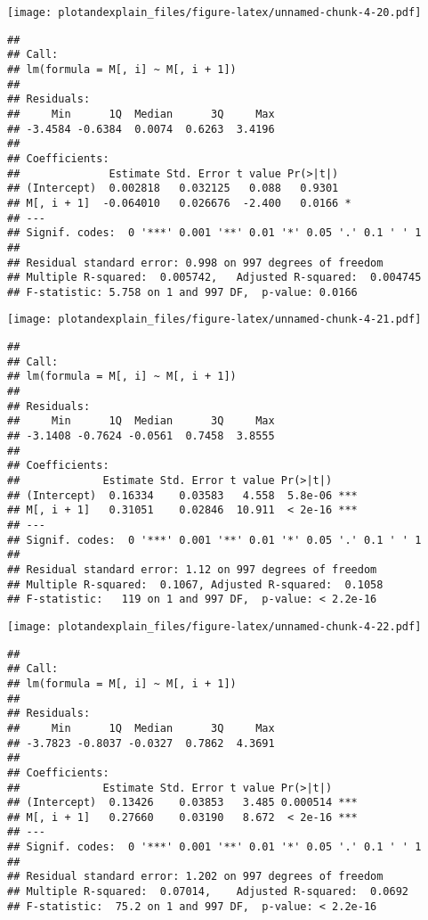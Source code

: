 \documentclass[]{article}
\begin{document}
\texttt{[image: plotandexplain\_files/figure-latex/unnamed-chunk-4-20.pdf]}

\begin{verbatim}
## 
## Call:
## lm(formula = M[, i] ~ M[, i + 1])
## 
## Residuals:
##     Min      1Q  Median      3Q     Max 
## -3.4584 -0.6384  0.0074  0.6263  3.4196 
## 
## Coefficients:
##              Estimate Std. Error t value Pr(>|t|)  
## (Intercept)  0.002818   0.032125   0.088   0.9301  
## M[, i + 1]  -0.064010   0.026676  -2.400   0.0166 *
## ---
## Signif. codes:  0 '***' 0.001 '**' 0.01 '*' 0.05 '.' 0.1 ' ' 1
## 
## Residual standard error: 0.998 on 997 degrees of freedom
## Multiple R-squared:  0.005742,   Adjusted R-squared:  0.004745 
## F-statistic: 5.758 on 1 and 997 DF,  p-value: 0.0166
\end{verbatim}

\texttt{[image: plotandexplain\_files/figure-latex/unnamed-chunk-4-21.pdf]}

\begin{verbatim}
## 
## Call:
## lm(formula = M[, i] ~ M[, i + 1])
## 
## Residuals:
##     Min      1Q  Median      3Q     Max 
## -3.1408 -0.7624 -0.0561  0.7458  3.8555 
## 
## Coefficients:
##             Estimate Std. Error t value Pr(>|t|)    
## (Intercept)  0.16334    0.03583   4.558  5.8e-06 ***
## M[, i + 1]   0.31051    0.02846  10.911  < 2e-16 ***
## ---
## Signif. codes:  0 '***' 0.001 '**' 0.01 '*' 0.05 '.' 0.1 ' ' 1
## 
## Residual standard error: 1.12 on 997 degrees of freedom
## Multiple R-squared:  0.1067, Adjusted R-squared:  0.1058 
## F-statistic:   119 on 1 and 997 DF,  p-value: < 2.2e-16
\end{verbatim}

\texttt{[image: plotandexplain\_files/figure-latex/unnamed-chunk-4-22.pdf]}

\begin{verbatim}
## 
## Call:
## lm(formula = M[, i] ~ M[, i + 1])
## 
## Residuals:
##     Min      1Q  Median      3Q     Max 
## -3.7823 -0.8037 -0.0327  0.7862  4.3691 
## 
## Coefficients:
##             Estimate Std. Error t value Pr(>|t|)    
## (Intercept)  0.13426    0.03853   3.485 0.000514 ***
## M[, i + 1]   0.27660    0.03190   8.672  < 2e-16 ***
## ---
## Signif. codes:  0 '***' 0.001 '**' 0.01 '*' 0.05 '.' 0.1 ' ' 1
## 
## Residual standard error: 1.202 on 997 degrees of freedom
## Multiple R-squared:  0.07014,    Adjusted R-squared:  0.0692 
## F-statistic:  75.2 on 1 and 997 DF,  p-value: < 2.2e-16
\end{verbatim}
\end{document}
